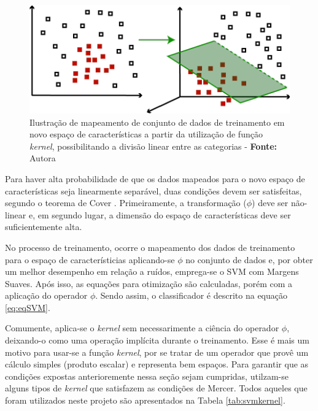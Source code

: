 \begin{figure}[H]
 \centering
  \includegraphics[width=0.75\linewidth]{figuras/svmKernel.pdf}
  \caption{Ilustração de mapeamento de conjunto de dados de treinamento em novo espaço de características a partir da utilização de função \textit{kernel}, possibilitando a divisão linear entre as categorias - \textbf{Fonte:} Autora}
  \label{fig:svmKernel}
\end{figure}

Para haver alta probabilidade de que os dados mapeados para o novo espaço de características seja linearmente separável, duas condições devem ser satisfeitas, segundo o teorema de Cover . Primeiramente, a transformação ($\phi$) deve ser não-linear e, em segundo lugar, a dimensão do espaço de características deve ser suficientemente alta.

No processo de treinamento, ocorre o mapeamento dos dados de treinamento para o espaço de característicias aplicando-se $\phi$ no conjunto de dados e, por obter um melhor desempenho em relação a ruídos, emprega-se o SVM com Margens Suaves. Após isso, as equações para otimização são calculadas, porém com a aplicação do operador $\phi$. Sendo assim, o classificador é descrito na equação \ref{eq:eqSVM}.

Comumente, aplica-se o \textit{kernel} sem necessarimente a ciência do operador $\phi$, deixando-o como uma operação implícita durante o treinamento. Esse é mais um motivo para usar-se a função \textit{kernel}, por se tratar de um operador que provê um cálculo simples (produto escalar) e representa bem espaços. Para garantir que as condições expostas anterioremente nessa seção sejam cumpridas, utilzam-se alguns tipos de \textit{kernel} que satisfazem as condições de Mercer. Todos aqueles que foram utilizados neste projeto são apresentados na Tabela \ref{tab:svmkernel}.

